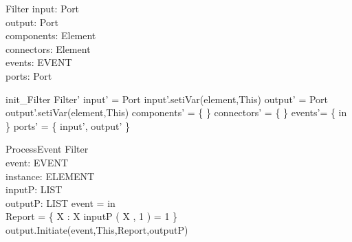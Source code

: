 \begin{schema}{Filter}
input:  Port \\
output: Port \\
components: \pset Element \\
connectors: \pset Element \\
events: \pset EVENT \\
ports: \pset Port 
\end{schema}


\begin{zed}
init\_Filter \sdef \lsch Filter' \bbar input' = \new Port \land input'.setiVar(element,This) \land output' = \new Port \land output'.setiVar(element,This) \land  components' = \{ \} \land  connectors' = \{ \} \land events'= \{ in \}  \land ports' = \{ input', output'   \} \rsch  \end{zed}

\begin{schema}{ProcessEvent}
\Delta Filter \\
event: EVENT \\
instance: ELEMENT \\
inputP: LIST \\
outputP: LIST 
\where event = in \\
Report = \{ X : \nat \bbar X \mem inputP \land \nth( X , 1 ) = 1 \} \\
output.Initiate(event,This,Report,outputP)
\end{schema}

